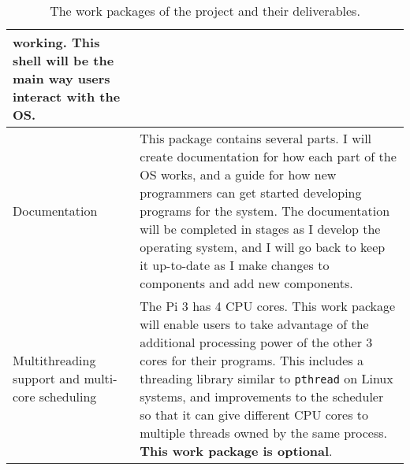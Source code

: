 \documentclass{article}
\begin{document}
\begin{table}[tbp]
\begin{center}
\begin{tabular}{|p{45mm}|p{125mm}|}
    working. This shell will be the main way users interact with the OS.
    \\ \hline
    Documentation &
    This package contains several parts. I will create documentation for how
    each part of the OS works, and a guide for how new programmers can get
    started developing programs for the system. The documentation will be
    completed in stages as I develop the operating system, and I will go back
    to keep it up-to-date as I make changes to components and add new
    components.
    \\ \hline
    Multithreading support and multi-core scheduling &
    The Pi 3 has 4 CPU cores. This work package will enable users to take
    advantage of the additional processing power of the other 3 cores for their
    programs. This includes a threading library similar to \texttt{pthread} on
    Linux systems, and improvements to the scheduler so that it can give
    different CPU cores to multiple threads owned by the same process.
    \textbf{This work package is optional}.
    \\ \hline
\end{tabular}
\caption{The work packages of the project and their deliverables.}
\label{tab:work-packages}
\end{center}
\end{table}



\nocite{design-of-unix-os}
\nocite{osdev-wiki}
\nocite{unix-prog-env}
\printbibliography
\end{document}
